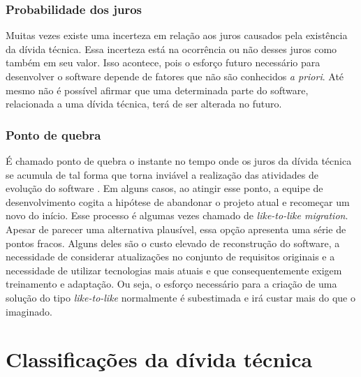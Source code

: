 \subsubsection{Probabilidade dos juros}

Muitas vezes existe uma incerteza em relação aos juros causados pela existência da dívida técnica. Essa incerteza está na ocorrência ou não desses juros como também em seu valor.  
Isso acontece, pois o esforço futuro necessário para desenvolver o software depende de fatores que não são conhecidos \textit{a priori}. Até mesmo não é possível afirmar que uma determinada parte do software, relacionada a uma dívida técnica, terá de ser alterada no futuro. 

\subsubsection{Ponto de quebra}

É chamado ponto de quebra o instante no tempo onde os juros da dívida técnica se acumula de tal forma que torna inviável a realização das atividades de evolução do software \cite{chatzigeorgiou2015estimating}. Em alguns casos, ao atingir esse ponto, a equipe de desenvolvimento cogita a hipótese de abandonar o projeto atual e recomeçar um novo do início. Esse processo é algumas vezes chamado de \textit{like-to-like migration}.  Apesar de parecer uma alternativa plausível, essa opção apresenta uma série de pontos fracos. Alguns deles são o custo elevado de reconstrução do software, a necessidade de considerar atualizações no conjunto de requisitos originais e a necessidade de utilizar tecnologias mais atuais e que consequentemente exigem treinamento e adaptação\cite{sterling2010managing}. Ou seja, o esforço necessário para a criação de uma solução do tipo \textit{like-to-like} normalmente é subestimada e irá custar mais do que o imaginado. 
 

\section{Classificações da dívida técnica}
\label{classificacoes_divida_tecnica}

